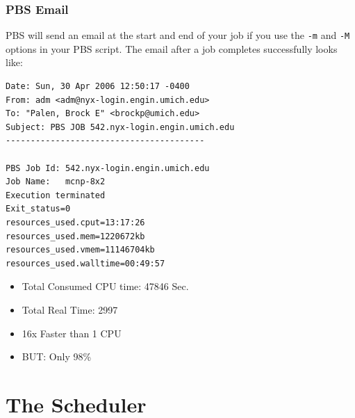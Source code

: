 \documentclass{beamer}
\begin{document}
\begin{frame}[fragile]
 \frametitle{PBS Email}
PBS will send an email at the start and end of your job if you use the
\texttt{-m} and \texttt{-M} options in your PBS script.  The email after a job
completes successfully looks like:
\tiny
\begin{verbatim}
Date: Sun, 30 Apr 2006 12:50:17 -0400
From: adm <adm@nyx-login.engin.umich.edu>
To: "Palen, Brock E" <brockp@umich.edu>
Subject: PBS JOB 542.nyx-login.engin.umich.edu
----------------------------------------

PBS Job Id: 542.nyx-login.engin.umich.edu
Job Name:   mcnp-8x2
Execution terminated
Exit_status=0
resources_used.cput=13:17:26
resources_used.mem=1220672kb
resources_used.vmem=11146704kb
resources_used.walltime=00:49:57
\end{verbatim}
\normalsize
\begin{itemize}
  \item<2-> Total Consumed CPU time: 47846 Sec.
  \item<2-> Total Real Time: 2997
  \item<3-> 16x Faster than 1 CPU 
  \item<4-> BUT: Only 98\% 
\end{itemize}
\end{frame}
\section{The Scheduler}
\end{document}

